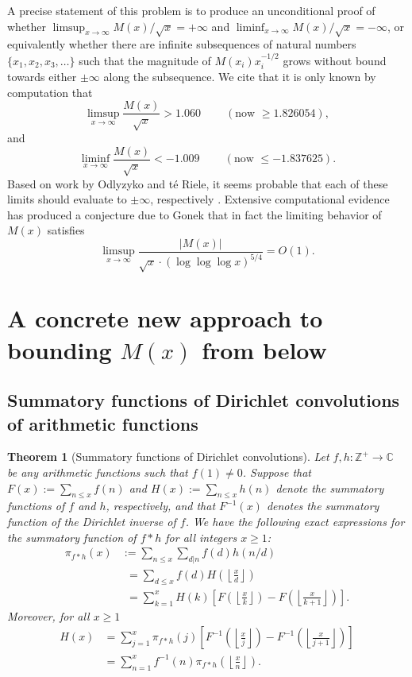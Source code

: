 \documentclass[11pt,reqno,a4letter]{article}
\numberwithin{figure}{section}
\numberwithin{table}{section}
\newcommand{\cf}{\textit{cf.\ }}
\newcommand{\seqnum}[1]{\href{http://oeis.org/#1}{\color{ProcessBlue}{\underline{#1}}}}
\newcommand{\Floor}[2]{\ensuremath{\left\lfloor \frac{#1}{#2} \right\rfloor}}
\theoremstyle{plain}
\newtheorem{theorem}{Theorem}
\numberwithin{theorem}{section}
\theoremstyle{definition}
\begin{document}
A precise statement of this 
problem is to produce an unconditional proof of whether 
$\limsup_{x \rightarrow \infty} M(x) / \sqrt{x} = +\infty$ and 
$\liminf_{x \rightarrow \infty} M(x) / \sqrt{x} = -\infty$, or 
equivalently whether there are infinite subsequences of natural numbers 
$\{x_1, x_2, x_3, \ldots\}$ such that the magnitude of 
$M(x_i) x_i^{-1/2}$ grows without bound towards either $\pm \infty$ 
along the subsequence. 
We cite that it is only known by computation 
that \cite[\cf \S 4.1]{PRIMEREC} 
\cite[\cf \seqnum{A051400}; \seqnum{A051401}]{OEIS} 
\[
\limsup_{x\rightarrow\infty} \frac{M(x)}{\sqrt{x}} > 1.060\ \qquad (\text{now } \geq 1.826054), 
\] 
and 
\[ 
\liminf_{x\rightarrow\infty} \frac{M(x)}{\sqrt{x}} < -1.009\ \qquad (\text{now } \leq -1.837625). 
\] 
Based on work by Odlyzyko and t\'{e} Riele, it seems probable that 
each of these limits should evaluate to $\pm \infty$, respectively 
\cite{ODLYZ-TRIELE,MREVISITED,ORDER-MERTENSFN,HURST-2017}. 
Extensive computational evidence has produced 
a conjecture due to Gonek that in fact the limiting behavior of 
$M(x)$ satisfies \cite{NG-MERTENS}
$$\limsup_{x \rightarrow \infty} \frac{|M(x)|}{\sqrt{x} \cdot (\log\log\log x)^{5/4}} = O(1).$$ 

\newpage 
\section{A concrete new approach to bounding $M(x)$ from below} 

\subsection{Summatory functions of Dirichlet convolutions of arithmetic functions} 

\begin{theorem}[Summatory functions of Dirichlet convolutions] 
\label{theorem_SummatoryFuncsOfDirCvls} 
Let $f,h: \mathbb{Z}^{+} \rightarrow \mathbb{C}$ be any arithmetic functions such that $f(1) \neq 0$. 
Suppose that $F(x) := \sum_{n \leq x} f(n)$ and $H(x) := \sum_{n \leq x} h(n)$ denote the summatory 
functions of $f$ and $h$, respectively, and that $F^{-1}(x)$ denotes the summatory function of the 
Dirichlet inverse of $f$. We have the following exact expressions for the 
summatory function of $f \ast h$ for all integers $x \geq 1$: 
\begin{align*} 
\pi_{f \ast h}(x) & := \sum_{n \leq x} \sum_{d|n} f(d) h(n/d) \\ 
     & \phantom{:}= \sum_{d \leq x} f(d) H\left(\Floor{x}{d}\right) \\ 
     & \phantom{:}= \sum_{k=1}^{x} H(k) \left[F\left(\Floor{x}{k}\right) - 
     F\left(\Floor{x}{k+1}\right)\right]. 
\end{align*} 
Moreover, for all $x \geq 1$ 
\begin{align*} 
H(x) & = \sum_{j=1}^{x} \pi_{f \ast h}(j) \left[F^{-1}\left(\Floor{x}{j}\right) - 
     F^{-1}\left(\Floor{x}{j+1}\right)\right] \\ 
     & = \sum_{n=1}^{x} f^{-1}(n) \pi_{f \ast h}\left(\Floor{x}{n}\right). 
\end{align*} 
\end{theorem} 
\end{document}
